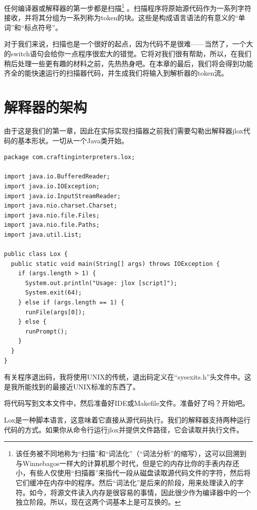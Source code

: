 \documentclass[cn,10pt,math=newtx,citestyle=gb7714-2015,bibstyle=gb7714-2015]{elegantbook}
\newenvironment{code}{\captionsetup{type=listing}}{}
\begin{document}
任何编译器或解释器的第一步都是扫描\footnote{该任务被不同地称为“扫描”和“词法化”（“词法分析”的缩写），这可以回溯到与Winnebagos一样大的计算机那个时代，但是它的内存比你的手表内存还小，有些人仅使用“扫描器”来指代一段从磁盘读取源代码文件的字符，然后将它们缓冲在内存中的程序。然后“词法化”是后来的阶段，用来处理读入的字符。如今，将源文件读入内存是很容易的事情，因此很少作为编译器中的一个独立阶段。所以，现在这两个词基本上是可互换的。} 。扫描程序将原始源代码作为一系列字符接收，并将其分组为一系列称为token的块。这些是构成语言语法的有意义的“单词”和“标点符号”。

对于我们来说，扫描也是一个很好的起点，因为代码不是很难——当然了，一个大的switch语句会给你一点程序很宏大的错觉。它将对我们很有帮助，所以，在我们稍后处理一些更有趣的材料之前，先热热身吧。在本章的最后，我们将会得到功能齐全的能快速运行的扫描器代码，并生成我们将输入到解析器的token流。

\section{解释器的架构}

由于这是我们的第一章，因此在实际实现扫描器之前我们需要勾勒出解释器jlox代码的基本形状。一切从一个Java类开始。

\begin{code}
\begin{verbatim}
package com.craftinginterpreters.lox;

import java.io.BufferedReader;
import java.io.IOException;
import java.io.InputStreamReader;
import java.nio.charset.Charset;
import java.nio.file.Files;
import java.nio.file.Paths;
import java.util.List;

public class Lox {
  public static void main(String[] args) throws IOException {
    if (args.length > 1) {
      System.out.println("Usage: jlox [script]");
      System.exit(64); 
    } else if (args.length == 1) {
      runFile(args[0]);
    } else {
      runPrompt();
    }
  }
}
\end{verbatim}
\end{code}

\begin{tcolorbox}
有关程序退出码，我将使用UNIX的传统，退出码定义在“sysexits.h”头文件中。这是我所能找到的最接近UNIX标准的东西了。
\end{tcolorbox}

将代码写到文本文件中，然后准备好IDE或Makefile文件。准备好了吗？开始吧。

Lox是一种脚本语言，这意味着它直接从源代码执行。我们的解释器支持两种运行代码的方式。如果你从命令行运行jlox并提供文件路径，它会读取并执行文件。
\end{document}
